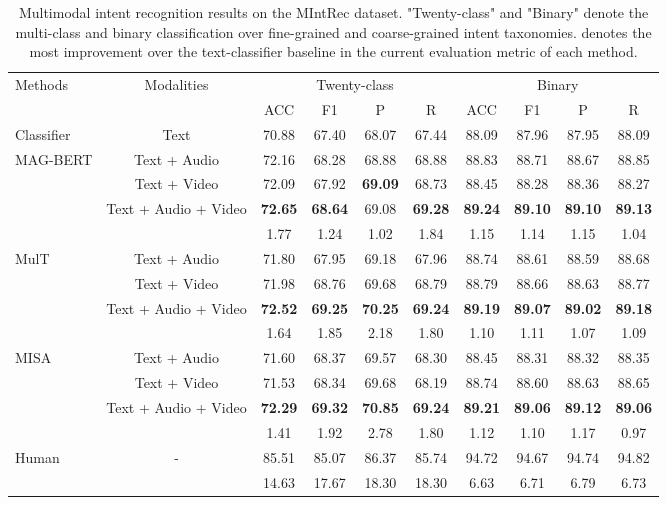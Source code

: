 \documentclass[sigconf,camera-ready]{acmart}
\begin{document}
\begin{table*}[t!]\small
			\caption{\label{results-main-1}  
			Multimodal intent recognition results on the MIntRec dataset. "Twenty-class" and "Binary" denote the multi-class and binary classification over fine-grained and coarse-grained intent taxonomies.  denotes the most improvement over the text-classifier baseline in the current evaluation metric of each method.}
	\centering
	\begin{tabular}{@{\extracolsep{3pt}}l|c|cccc|cccc}
		\toprule
		\multirow{2}{*}{Methods} & \multirow{2}{*}{Modalities} 
		& \multicolumn{4}{c|}{Twenty-class}& \multicolumn{4}{c}{Binary}\\
		
		&& ACC  & F1  & P  & R & ACC  & F1  & P & R \\ 
		\midrule
		Classifier & Text & 70.88 & 67.40 & 68.07 & 67.44 & 88.09 & 87.96 &	87.95 &	88.09\\
		\midrule
		\multirow{4}{*}{MAG-BERT} & Text + Audio & 72.16 & 68.28 & 68.88 &	68.88 &	88.83 &	88.71 &	88.67 &	88.85  \\
		& Text + Video & 72.09 & 67.92 & \textbf{69.09} & 68.73 &	88.45 &	88.28 &	88.36 &	88.27 \\
		& Text + Audio + Video & \textbf{72.65} & \textbf{68.64} & 69.08 & \textbf{69.28}  & \textbf{89.24} & \textbf{89.10} & \textbf{89.10}  & \textbf{89.13} \\ 
		&  & 1.77 & 1.24 & 1.02 & 1.84  & 1.15 & 1.14 & 1.15  & 1.04 \\ 
		
		\midrule
		\multirow{4}{*}{MulT} & Text + Audio & 71.80 &	67.95 &	69.18 &	67.96 &	88.74 &	88.61 &	88.59 &	88.68 \\
		& Text + Video & 71.98 & 68.76 & 69.68 & 68.79 & 88.79 & 88.66 & 88.63 & 88.77\\
		& Text + Audio + Video & \textbf{72.52} & \textbf{69.25} & \textbf{70.25} & \textbf{69.24}  & \textbf{89.19} & \textbf{89.07} & \textbf{89.02}  & \textbf{89.18} \\
		& & 1.64 & 1.85 & 2.18 & 1.80  & 1.10 & 1.11 & 1.07  & 1.09 \\ 
		
		\midrule
		\multirow{4}{*}{MISA}& Text + Audio & 71.60 & 68.37 & 69.57 &	68.30 &	88.45 &	88.31 &	88.32 &	88.35  \\
		& Text + Video & 71.53 & 68.34 & 69.68 & 68.19 & 88.74 &	88.60 &	88.63 &	88.65 \\
		& Text + Audio + Video & \textbf{72.29} & \textbf{69.32} & \textbf{70.85} & \textbf{69.24}  & \textbf{89.21} & \textbf{89.06} & \textbf{89.12}  & \textbf{89.06} \\ 
		&  & 1.41 & 1.92 & 2.78 & 1.80  & 1.12 & 1.10 & 1.17  & 0.97 \\ 
		\midrule
		\multirow{2}{*}{Human} 
		& - & 
		85.51 & 
		85.07 & 
		86.37 & 
		85.74 & 
		94.72 & 
		94.67 & 
		94.74 & 
		94.82 \\
		&  & 14.63 & 17.67 & 18.30 &
		18.30 & 6.63 & 6.71 & 6.79  & 6.73 \\
		\bottomrule 
	\end{tabular}
\end{table*}  
\end{document}
